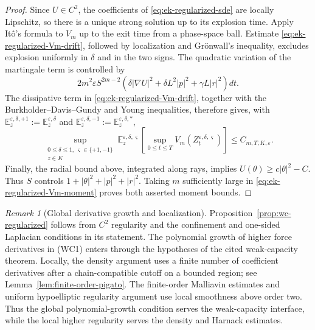 \documentclass[11pt]{article}
\numberwithin{equation}{section}
\theoremstyle{plain}
\theoremstyle{definition}
\theoremstyle{remark}
\newtheorem{remark}[theorem]{Remark}
\newcommand{\eps}{\varepsilon}
\newcommand{\E}{\mathbb E}
\begin{document}
\begin{proof}
Since $U\in C^2$, the coefficients of
\eqref{eq:ek-regularized-sde} are locally Lipschitz, so there is a unique
strong solution up to its explosion time.  Apply It\^o's formula to $V_m$
up to the exit time from a phase-space ball.  Estimate
\eqref{eq:ek-regularized-Vm-drift}, followed by localization and Gr\"onwall's
inequality, excludes explosion uniformly in $\delta$ and in the two signs.
The quadratic variation of the martingale term is controlled by
\[
2m^2\eps S^{2m-2}
\left(\delta|\nabla U|^2+\delta L^2|p|^2+\gamma L|r|^2\right)dt.
\]
The dissipative term in \eqref{eq:ek-regularized-Vm-drift}, together with the
Burkholder--Davis--Gundy and Young inequalities, therefore gives, with
$\E_z^{\eps,\delta,+1}:=\E_z^{\eps,\delta}$ and
$\E_z^{\eps,\delta,-1}:=\E_z^{\eps,\delta,*}$,
\begin{equation}
\label{eq:ek-regularized-Vm-moment}
\sup_{\substack{0\le\delta\le1,\ \varsigma\in\{+1,-1\}\\z\in K}}
\E_z^{\eps,\delta,\varsigma}
\left[\sup_{0\le t\le T}V_m
\left(Z_t^{\eps,\delta,\varsigma}\right)\right]
\le C_{m,T,K,\eps}.
\end{equation}
Finally, the radial bound above, integrated along rays, implies
$U(\theta)\ge c|\theta|^2-C$.  Thus $S$ controls
$1+|\theta|^2+|p|^2+|r|^2$.  Taking $m$ sufficiently large in
\eqref{eq:ek-regularized-Vm-moment} proves both asserted moment bounds.
\end{proof}

\begin{remark}[Global derivative growth and localization]
\label{rem:global-derivative-localization}
Proposition~\ref{prop:wc-regularized} follows from $C^2$ regularity and the
confinement and one-sided Laplacian conditions in its statement.  The polynomial growth of
higher force derivatives in \textup{(WC1)} enters through the hypotheses of
the cited weak-capacity theorem.  Locally, the density argument uses a finite
number of coefficient derivatives after a chain-compatible cutoff on a
bounded region; see Lemma~\ref{lem:finite-order-pigato}.  The finite-order
Malliavin estimates and uniform hypoelliptic regularity argument use local
smoothness above order two.  Thus the global polynomial-growth condition
serves the weak-capacity interface, while the local higher regularity serves
the density and Harnack estimates.
\end{remark}
\end{document}
